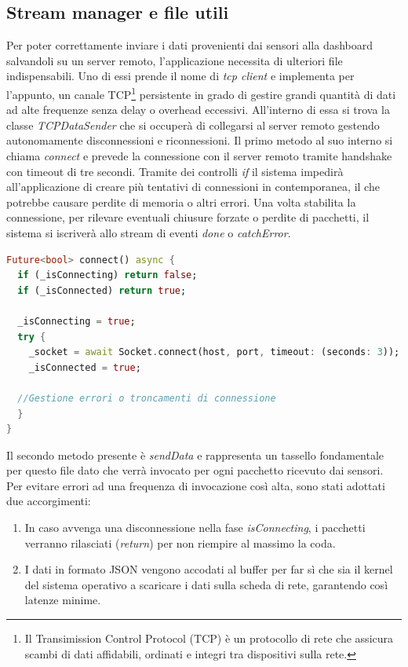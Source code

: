 \documentclass[target=bach,aauheader=,style=]{thud}
\begin{document}
\subsection{Stream manager e file utili}
Per poter correttamente inviare i dati provenienti dai sensori alla dashboard salvandoli su un server remoto, l'applicazione necessita di ulteriori file indispensabili. Uno di essi prende il nome di \textit{tcp client} e implementa per l'appunto, un canale TCP\footnote{Il Transimission Control Protocol (TCP) è un protocollo di rete che assicura scambi di dati affidabili, ordinati e integri tra dispositivi sulla rete.} persistente in grado di gestire grandi quantità di dati ad alte frequenze senza delay o overhead eccessivi. All'interno di essa si trova la classe \textit{TCPDataSender} che si occuperà di collegarsi al server remoto gestendo autonomamente disconnessioni e riconnessioni. Il primo metodo al suo interno si chiama \textit{connect} e prevede la connessione con il server remoto tramite handshake con timeout di tre secondi. Tramite dei controlli \textit{if} il sistema impedirà all'applicazione di creare più tentativi di connessioni in contemporanea, il che potrebbe causare perdite di memoria o altri errori. Una volta stabilita la connessione, per rilevare eventuali chiusure forzate o perdite di pacchetti, il sistema si iscriverà allo stream di eventi \textit{done} o \textit{catchError}.

\begin{lstlisting}[language=dart, caption={Apertura della connessione con timeout.}, label={tcp_connect}]
Future<bool> connect() async {
  if (_isConnecting) return false;
  if (_isConnected) return true;

  _isConnecting = true;
  try {
    _socket = await Socket.connect(host, port, timeout: (seconds: 3));
    _isConnected = true;
    
  //Gestione errori o troncamenti di connessione
  }
}
\end{lstlisting}
Il secondo metodo presente è \textit{sendData} e rappresenta un tassello fondamentale per questo file dato che verrà invocato per ogni pacchetto ricevuto dai sensori. Per evitare errori ad una frequenza di invocazione così alta, sono stati adottati due accorgimenti:
\begin{enumerate}
  \item In caso avvenga una disconnessione nella fase \textit{isConnecting}, i pacchetti verranno rilasciati (\textit{return}) per non riempire al massimo la coda.
  \item I dati in formato JSON vengono accodati al buffer per far sì che sia il kernel del sistema operativo a scaricare i dati sulla scheda di rete, garantendo così latenze minime.
\end{enumerate}
\end{document}
